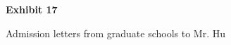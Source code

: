 \documentclass{article}
\begin{document}
% 

% 

% 

% 

% 

% 

% 

% 

% 

% 

% 

% 



\vspace*{\fill}
\begin{center}

{\LARGE \bf
Exhibit 17
}

\vspace{10\baselineskip}

{\large Admission letters from graduate schools to Mr. Hu}

\end{center}
\vspace*{\fill}

% 

% 

% 
\end{document}
